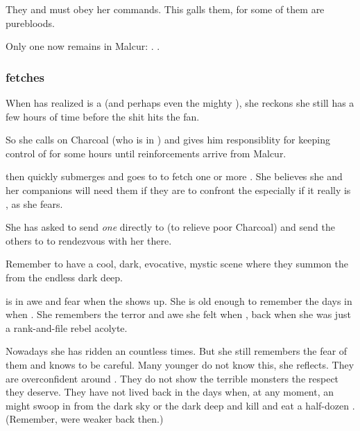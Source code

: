 \begin{garbage}
They  and must obey her commands. 
This galls them, for some of them are purebloods. 

Only one \resphan{} now remains in Malcur: \Paerzim. 
. 





\subsubsection{\Achsah{} fetches \umbrae}
When \Achsah{} has realized \Takestsha{} is a \dragon{} (and perhaps even the mighty \Nzessuacrith), she reckons she still has a few hours of time before the shit hits the fan. 

So she calls on Charcoal (who is in \Forklin) and gives him responsiblity for keeping control of \Forklin{} for some hours until reinforcements arrive from Malcur. 

\Achsah{} then quickly submerges and goes to \Nyx{} to fetch one or more \umbrae. 
She believes she and her companions will need them if they are to confront the \dragon\dash especially if it really is \Nzessuacrith, as she fears. 

She has asked \Teshrial{} to send \emph{one} \resphan{} directly to \Forklin{} (to relieve poor Charcoal) and send the others to \Nyx{} to rendezvous with her there. 

Remember to have a cool, dark, evocative, mystic scene where they summon the \umbrae{} from the endless dark deep. 

\Achsah{} is in awe and fear when the \umbra{} shows up. 
She is old enough to remember the days in \Merkyrah{} when . 
She remembers the terror and awe she felt when , back when she was just a rank-and-file rebel acolyte. 

Nowadays she has ridden an \umbra{} countless times. 
But she still remembers the fear of them and knows to be careful. 
Many younger \resphain{} do not know this, she reflects. 
They are overconfident around \umbrae.
They do not show the terrible monsters the respect they deserve. 
They have not lived back in the days when, at any moment, an \umbra{} might swoop in from the dark sky or the dark deep and kill and eat a half-dozen \resphain. 
(Remember, \resphain{} were weaker back then.)










\end{garbage}
